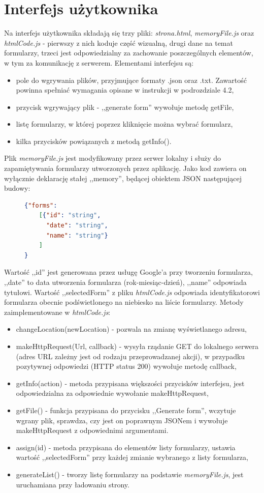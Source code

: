 \section{Interfejs użytkownika}
Na interfejs użytkownika składają się trzy pliki: \textit{strona.html}, \textit{memoryFile.js} oraz \textit{htmlCode.js} - pierwszy z nich koduje część wizualną, drugi dane na temat formularzy, trzeci jest odpowiedzialny za zachowanie poszczególnych elementów, w tym za komunikację z serwerem. 
\ind Elementami interfejsu są:
\begin{itemize}
\item pole do wgrywania plików, przyjmujące formaty .json oraz .txt. Zawartość powinna spełniać wymagania opisane w instrukcji w podrozdziale 4.2, %
\item przycisk wgrywający plik - ,,generate form'' wywołuje metodę getFile,
\item listę formularzy, w której poprzez kliknięcie można wybrać formularz,
\item kilka przycisków powiązanych z metodą getInfo().
\end{itemize}
\ind Plik \textit{memoryFile.js} jest modyfikowany przez serwer lokalny i służy do zapamiętywania formularzy utworzonych przez aplikację. Jako kod zawiera on wyłącznie deklarację stałej ,,memory'', będącej obiektem JSON następującej budowy:
\begin{figure}[H]
\begin{lstlisting}[language=json,firstnumber=1]
{"forms":
    [{"id": "string",
      "date": "string",
      "name": "string"}
    ]
}
\end{lstlisting}
\end{figure}
Wartość ,,id'' jest generowana przez usługę Google'a przy tworzeniu formularza, ,,date'' to data utworzenia formularza (rok-miesiąc-dzień), ,,name'' odpowiada tytułowi.
\ind Wartość ,,selectedForm'' z pliku \textit{htmlCode.js} odpowiada identyfikatorowi formularza obecnie podświetlonego na niebiesko na liście formularzy. Metody zaimplementowane w \textit{htmlCode.js}:
\begin{itemize}
\item changeLocation(newLocation) - pozwala na zmianę wyświetlanego adresu,
\item makeHttpRequest(Url, callback) - wysyła rządanie GET do lokalnego serwera (adres URL zależny jest od rodzaju przeprowadzanej akcji), w przypadku pozytywnej odpowiedzi (HTTP status 200) wywołuje metodę callback,
\item getInfo(action) - metoda przypisana większości przycisków interfejsu, jest odpowiedzialna za odpowiednie wywołanie makeHttpRequest,
\item getFile() - funkcja przypisana do przycisku ,,Generate form'', wczytuje wgrany plik, sprawdza, czy jest on poprawnym JSONem i wywołuje makeHttpRequest z odpowiednimi argumentami.
\item assign(id) - metoda przypisana do elementów listy formularzy, ustawia wartość ,,selectedForm'' przy każdej zmianie wybranego z listy formularza,
\item generateList() - tworzy listę formularzy na podstawie \textit{memoryFile.js}, jest uruchamiana przy ładowaniu strony.
\end{itemize}
